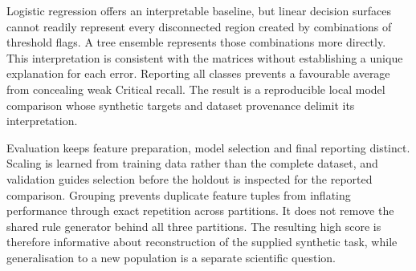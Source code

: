 \begin{reportprose}
Logistic regression offers an interpretable baseline, but linear decision surfaces cannot readily represent every disconnected region created by combinations of threshold flags. A tree ensemble represents those combinations more directly. This interpretation is consistent with the matrices without establishing a unique explanation for each error. Reporting all classes prevents a favourable average from concealing weak Critical recall. The result is a reproducible local model comparison whose synthetic targets and dataset provenance delimit its interpretation.

Evaluation keeps feature preparation, model selection and final reporting distinct. Scaling is learned from training data rather than the complete dataset, and validation guides selection before the holdout is inspected for the reported comparison. Grouping prevents duplicate feature tuples from inflating performance through exact repetition across partitions. It does not remove the shared rule generator behind all three partitions. The resulting high score is therefore informative about reconstruction of the supplied synthetic task, while generalisation to a new population is a separate scientific question.
\end{reportprose}
\DatasetFigure
\MetricsTable
\ConfusionFigure
\RatesTable

